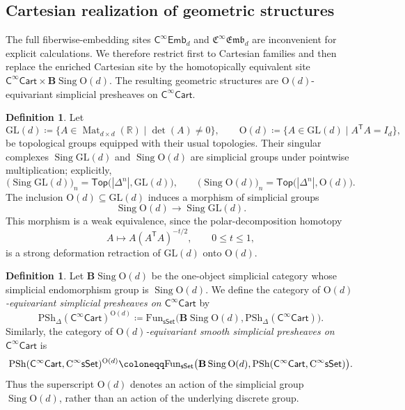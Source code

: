 \documentclass{amsart}
\newcommand{\cat}[1]{\mathsf{#1}}
\newcommand{\sset}{\cat{sSet}}
\newcommand{\Top}{\cat{Top}}
\DeclareMathOperator{\Sing}{Sing}
\newcommand{\CsSet}{\textnormal{C}^{\infty}\sset}
\newcommand{\Cart}{\cat{C}^{\infty}\cat{Cart}}
\newcommand{\fembnoniso}[1]{\cat{C}^{\infty}\cat{Emb}_{#1}}
\newcommand{\femb}[1]{\mathfrak{C}^{\infty}\mathfrak{Emb}_{#1}}
\newcommand{\Fun}{\mathrm{Fun}}
\newcommand{\psh}{\mathrm{PSh}}
\newcommand{\spsh}{\mathrm{PSh}_{\Delta}}
\newcommand{\GL}{\mathrm{GL}}
\newcommand{\RR}{{\mathbb{R}}}
\theoremstyle{definition}
\newtheorem{definition}[equation]{Definition}
\numberwithin{equation}{subsection}
\numberwithin{subsubsection}{subsection}
\begin{document}
\subsection{Cartesian realization of geometric
structures}\label{subsec:Cartesian.realization}

The full fiberwise-embedding sites \(\fembnoniso{d}\) and \(\femb{d}\) are
inconvenient for explicit calculations. We therefore restrict first to Cartesian
families
and then replace the enriched Cartesian site by the homotopically equivalent
site \(\Cart\times\mathbf{B}\Sing\mathrm{O}(d)\). The resulting geometric
structures are \(\mathrm{O}(d)\)-equivariant simplicial presheaves
on \(\Cart\).

\begin{definition}\label{def:sing.GLd.Od}
  Let
  \[
    \GL(d)\coloneqq
    \{A\in\operatorname{Mat}_{d\times d}(\RR)\mid \det(A)\neq 0\},
    \qquad
    \mathrm{O}(d)\coloneqq
    \{A\in\GL(d)\mid A^{\mathsf{T}}A=I_d\},
  \]
  be topological groups equipped with their usual topologies. Their singular
  complexes
  \(\Sing\GL(d)\) and \(\Sing\mathrm{O}(d)\) are simplicial groups under
  pointwise multiplication; explicitly,
  \[
    \bigl(\Sing\GL(d)\bigr)_n
    =\Top\bigl(|\Delta^n|,\GL(d)\bigr),
    \qquad
    \bigl(\Sing\mathrm{O}(d)\bigr)_n
    =\Top\bigl(|\Delta^n|,\mathrm{O}(d)\bigr).
  \]
  The inclusion \(\mathrm{O}(d)\subseteq\GL(d)\) induces a morphism of
  simplicial groups
  \[
    \Sing\mathrm{O}(d)\longrightarrow\Sing\GL(d).
  \]
  This morphism is a weak equivalence, since the polar-decomposition
  homotopy
  \[
    A\longmapsto A(A^{\mathsf{T}}A)^{-t/2},\qquad 0\leq t\leq 1,
  \]
  is a strong deformation retraction of \(\GL(d)\) onto \(\mathrm{O}(d)\).
\end{definition}

\begin{definition}\label{def:Od.equivariant.presheaves}
  Let \(\mathbf{B}\Sing\mathrm{O}(d)\) be the one-object simplicial
  category whose simplicial endomorphism group is \(\Sing\mathrm{O}(d)\).
  We define the category of
  \emph{\(\mathrm{O}(d)\)-equivariant simplicial presheaves on \(\Cart\)} by
  \[
    \spsh(\Cart)^{\mathrm{O}(d)}
    \coloneqq
    \Fun_{\sset}\bigl(\mathbf{B}\Sing\mathrm{O}(d),\spsh(\Cart)\bigr).
  \]
  Similarly, the category of \emph{\(\mathrm{O}(d)\)-equivariant smooth
  simplicial presheaves on \(\Cart\)} is
  \[
    \psh(\Cart,\CsSet)^{\mathrm{O}(d)}
    \coloneqq
    \Fun_{\sset}\bigl(\mathbf{B}\Sing\mathrm{O}(d),
    \psh(\Cart,\CsSet)\bigr).
  \]
  Thus the superscript \(\mathrm{O}(d)\) denotes an action of the simplicial
  group \(\Sing\mathrm{O}(d)\), rather than an action of the underlying
  discrete group.
\end{definition}
\end{document}
